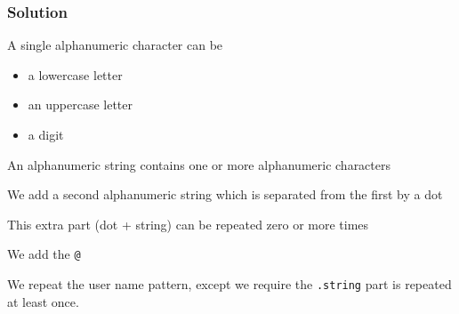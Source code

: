 \begin{frame}
  \frametitle{Solution}
  \begin{center}\ttfamily\small
  \end{center}
  \vskip5mm
  \vskip2mm
  \begin{overprint}
    \begin{center}
      A single alphanumeric character can be
      \begin{itemize}
        \item a lowercase letter
        \item an uppercase letter
        \item a digit
      \end{itemize}
    \end{center}

    \begin{center}
      An alphanumeric string contains one or more alphanumeric characters
    \end{center}

    \begin{center}
      We add a second alphanumeric string which is separated from the first by a dot
    \end{center}

    \begin{center}
      This extra part (dot + string) can be repeated zero or more times
    \end{center}

    \begin{center}
      We add the \texttt{@}
    \end{center}

    \begin{center}
      We repeat the user name pattern, except we require the \texttt{.string} part
      is repeated at least once.
    \end{center}
  \end{overprint}
\end{frame}
